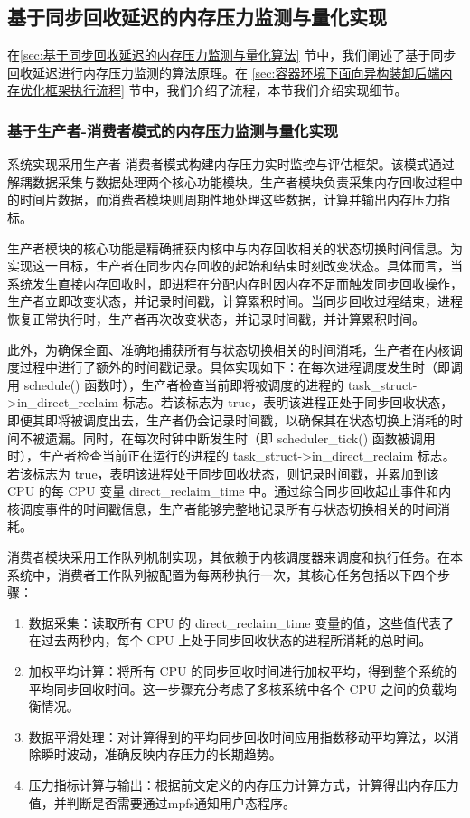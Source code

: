 \subsection{基于同步回收延迟的内存压力监测与量化实现}

在\ref{sec:基于同步回收延迟的内存压力监测与量化算法} 节中，我们阐述了基于同步回收延迟进行内存压力监测的算法原理。在 \ref{sec:容器环境下面向异构装卸后端内存优化框架执行流程} 节中，我们介绍了流程，本节我们介绍实现细节。

\subsubsection{基于生产者-消费者模式的内存压力监测与量化实现}

系统实现采用生产者-消费者模式构建内存压力实时监控与评估框架。该模式通过解耦数据采集与数据处理两个核心功能模块。生产者模块负责采集内存回收过程中的时间片数据，而消费者模块则周期性地处理这些数据，计算并输出内存压力指标。

生产者模块的核心功能是精确捕获内核中与内存回收相关的状态切换时间信息。为实现这一目标，生产者在同步内存回收的起始和结束时刻改变状态。具体而言，当系统发生直接内存回收时，即进程在分配内存时因内存不足而触发同步回收操作，生产者立即改变状态，并记录时间戳，计算累积时间。当同步回收过程结束，进程恢复正常执行时，生产者再次改变状态，并记录时间戳，并计算累积时间。

此外，为确保全面、准确地捕获所有与状态切换相关的时间消耗，生产者在内核调度过程中进行了额外的时间戳记录。具体实现如下：在每次进程调度发生时（即调用 schedule() 函数时），生产者检查当前即将被调度的进程的 task\_struct->in\_direct\_reclaim 标志。若该标志为 true，表明该进程正处于同步回收状态，即便其即将被调度出去，生产者仍会记录时间戳，以确保其在状态切换上消耗的时间不被遗漏。同时，在每次时钟中断发生时（即 scheduler\_tick() 函数被调用时），生产者检查当前正在运行的进程的 task\_struct->in\_direct\_reclaim 标志。若该标志为 true，表明该进程处于同步回收状态，则记录时间戳，并累加到该 CPU 的每 CPU 变量 direct\_reclaim\_time 中。通过综合同步回收起止事件和内核调度事件的时间戳信息，生产者能够完整地记录所有与状态切换相关的时间消耗。

消费者模块采用工作队列机制实现，其依赖于内核调度器来调度和执行任务。在本系统中，消费者工作队列被配置为每两秒执行一次，其核心任务包括以下四个步骤：

\begin{enumerate}
    \item 数据采集：读取所有 CPU 的 direct\_reclaim\_time 变量的值，这些值代表了在过去两秒内，每个 CPU 上处于同步回收状态的进程所消耗的总时间。
    \item 加权平均计算：将所有 CPU 的同步回收时间进行加权平均，得到整个系统的平均同步回收时间。这一步骤充分考虑了多核系统中各个 CPU 之间的负载均衡情况。
    \item 数据平滑处理：对计算得到的平均同步回收时间应用指数移动平均算法，以消除瞬时波动，准确反映内存压力的长期趋势。
    \item 压力指标计算与输出：根据前文定义的内存压力计算方式，计算得出内存压力值，并判断是否需要通过mpfs通知用户态程序。
\end{enumerate}


